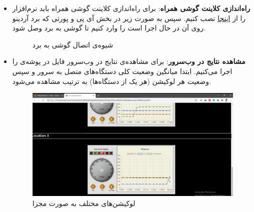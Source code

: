 \begin{itemize}
	\item 
	\textbf{راه‌اندازی کلاینت گوشی همراه}:
	برای راه‌اندازی کلاینت گوشی همراه باید نرم‌افزار 
	را از
	\href{https://play.google.com/store/apps/details?id=com.labcenter.iotbuilder&hl=en_GB}{اینجا}
	 نصب کنیم. سپس به صورت زیر در بخش 
	 آی پی و پورتی که برد آردینو روی آن در حال اجرا است را وارد کنیم تا گوشی به برد وصل شود. 
	 \begin{figure}[h!]
	 	\centering			 	
	 	\hfill	 	
	 	\caption{شیوه‌ی اتصال گوشی به برد}	
	 \end{figure}
	
	\item
	\textbf{مشاهده نتایج در وب‌سرور}:
	برای مشاهده‌ی نتایج در وب‌سرور فایل 
	در پوشه‌ی 
	را اجرا می‌کنیم. ابتدا میانگین وضعیت کلی دستگاه‌های متصل به سرور و سپس وضعیت هر لوکیشن (هر یک از دستگاه‌ها) به ترتیب مشاهده می‌شود. 
	\begin{figure}[h!]
		\centering		
		\includegraphics[width=0.8\linewidth]{figs/multiloc.png}
		\caption{لوکیشن‌های مختلف به صورت مجزا}
	\end{figure}
	
\end{itemize}

